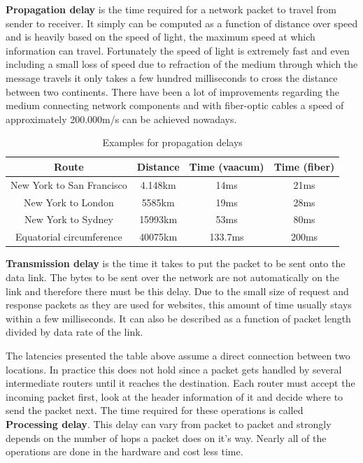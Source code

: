 \textbf{Propagation delay} is the time required for a network packet to travel from sender to receiver. It simply can be computed as a function of distance over speed and is heavily based on the speed of light, the maximum speed at which information can travel. Fortunately the speed of light is extremely fast and even including a small loss of speed due to refraction of the medium through which the message travels it only takes a few hundred milliseconds to cross the distance between two continents. There have been a lot of improvements regarding the medium connecting network components and with fiber-optic cables a speed of approximately 200.000m/s can be achieved nowadays. \cite{Grigorik_2013}

\begin{table}[h]
\begin{center}
\begin{tabular}{| c | c | c | c |}
    \hline
    Route & Distance & Time (vaacum) & Time (fiber) \\ \hline
    New York to San Francisco & 4.148km & 14ms & 21ms  \\ \hline
    New York to London & 5585km & 19ms & 28ms \\ \hline
    New York to Sydney & 15993km & 53ms & 80ms \\ \hline 
     Equatorial circumference & 40075km & 133.7ms & 200ms \\
    \hline
\end{tabular}
\caption{Examples for propagation delays \cite{Grigorik_2013}}
\end{center}
\end{table}

\textbf{Transmission delay} is the time it takes to put the packet to be sent onto the data link. \cite{Grigorik_2013} The bytes to be sent over the network are not automatically on the link and therefore there must be this delay. Due to the small size of request and response packets as they are used for websites, this amount of time usually stays within a few milliseconds. It can also be described as a function of packet length divided by data rate of the link.

The latencies presented the table above assume a direct connection between two locations. In practice this does not hold since a packet gets handled by several intermediate routers until it reaches the destination. Each router must accept the incoming packet first, look at the header information of it and decide where to send the packet next. The time required for these operations is called \textbf{Processing delay}.  This delay can vary from packet to packet and strongly depends on the number of hops a packet does on it's way. \cite{Killelea_2002} Nearly all of the operations are done in the hardware and cost less time. \cite{Grigorik_2013}


